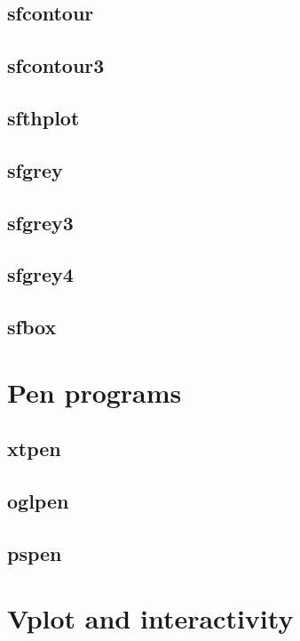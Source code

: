 \subsection{sfcontour}

\subsection{sfcontour3}

\subsection{sfthplot}

\subsection{sfgrey}

\subsection{sfgrey3}

\subsection{sfgrey4}

\subsection{sfbox}

\section{Pen programs}

\subsection{xtpen}

\subsection{oglpen}

\subsection{pspen}

\section{Vplot and interactivity}



